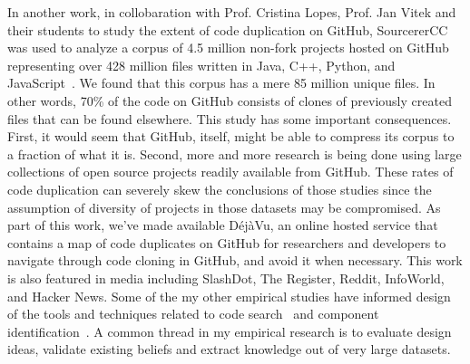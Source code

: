 \documentclass[a4paper]{article}
\begin{document}
In another work, in collobaration with Prof. Cristina Lopes, Prof. Jan Vitek and their students 
to study the extent of code duplication on GitHub, SourcererCC was used to 
analyze a corpus of 4.5 million non-fork projects hosted on GitHub representing over 428 million files written
in Java, C++, Python, and JavaScript~\cite{dejavu}. We found that this corpus has a mere 85 million unique files. In other
words, 70\% of the code on GitHub consists of clones of previously created files that can be found elsewhere. 
This study has some important consequences. First, it would seem that GitHub, itself, might be able to compress its corpus to a fraction of what it is. 
Second, more and more research is being done using large collections of open source projects readily available from GitHub.
These rates of code duplication can severely skew the conclusions of those studies since the assumption of diversity of projects in those datasets may be compromised.  
As part of this work, we've made available DéjàVu, an online hosted service that contains a map of code duplicates on GitHub for researchers and developers to navigate through code cloning in GitHub, and avoid it when necessary. This work is also featured in media including SlashDot, The Register, Reddit, InfoWorld, and Hacker News. Some of the my other empirical studies have informed design of the tools and techniques related to code search~\cite{codesearch, interfaceredundancy} and component identification~\cite{astra}. A common thread in my empirical research is to evaluate design ideas, validate existing beliefs and extract knowledge out of very large datasets.





\end{document}
